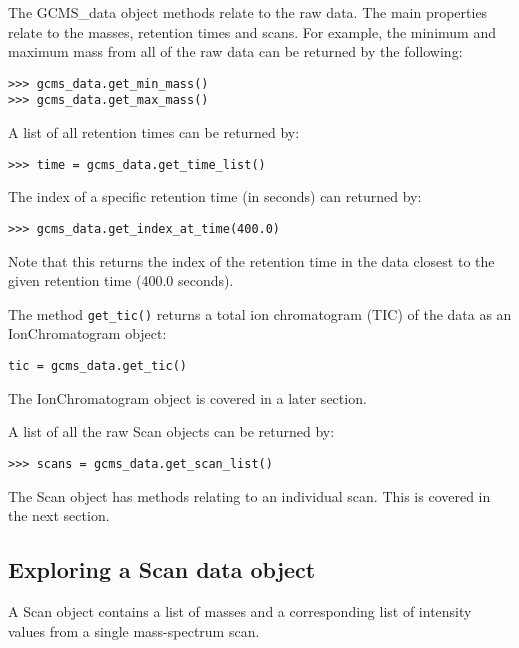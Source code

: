 The GCMS\_data object methods relate to the raw data. The main properties
relate to the masses, retention times and scans. For example, the
minimum and maximum mass from all of the raw data can be returned by the
following:

\begin{verbatim}
>>> gcms_data.get_min_mass()
>>> gcms_data.get_max_mass()
\end{verbatim}

A list of all retention times can be returned by:

\begin{verbatim}
>>> time = gcms_data.get_time_list()
\end{verbatim}

The index of a specific retention time (in seconds) can returned by:

\begin{verbatim}
>>> gcms_data.get_index_at_time(400.0)
\end{verbatim}

\noindent
Note that this returns the index of the retention time in the
data closest to the given retention time (400.0 seconds).

The method {\tt get\_tic()} returns a total ion chromatogram (TIC) of the data
as an IonChromatogram object:

\begin{verbatim}
tic = gcms_data.get_tic()
\end{verbatim}

\noindent
The IonChromatogram object is covered in a later section.

A list of all the raw Scan objects can be returned by:

\begin{verbatim}
>>> scans = gcms_data.get_scan_list()
\end{verbatim}

\noindent
The Scan object has methods relating to an individual scan. This is covered in
the next section.

\subsection {Exploring a Scan data object}


A Scan object contains a list of masses and a corresponding list of intensity
values from a single mass-spectrum scan.

